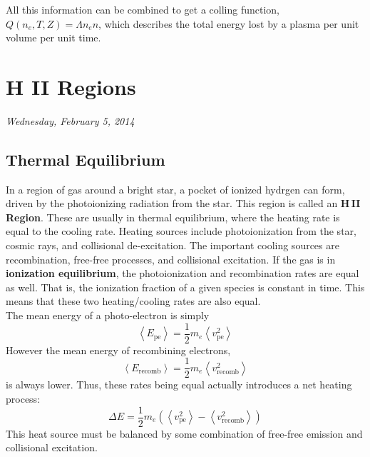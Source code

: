 \documentclass[10pt]{article}
\numberwithin{equation}{section}
\newcommand{\n}{\noindent}
\newcommand{\avg}[1]{\left\langle#1\right\rangle}
\begin{document}
  \n All this information can be combined to get a colling function, $Q(n_e, T,
  Z)=\Lambda n_e n$, which describes the total energy lost by a plasma per unit
  volume per unit time.
\section{H II Regions} %
\label{sec:h,ii_regions}
\textit{Wednesday, February 5, 2014}
\subsection{Thermal Equilibrium} %
\label{sub:thermal_equilibrium}
In a region of gas around a bright star, a pocket of ionized hydrgen can form,
driven by the photoionizing radiation from the star. This region is called an
\textbf{H\,II Region}. These are usually in thermal equilibrium, where the
heating rate is equal to the cooling rate. Heating sources include
photoionization from the star, cosmic rays, and collisional de-excitation. The
important cooling sources are recombination, free-free processes, and
collisional excitation. If the gas is in \textbf{ionization equilibrium}, the
photoionization and recombination rates are equal as well. That is, the
ionization fraction of a given species is constant in time. This means that
these two heating/cooling rates are also equal.\\

\n The mean energy of a photo-electron is simply
\begin{equation}
  \label{eq:h2:1} \avg{E_{\mathrm{pe}}} = \frac{1}{2}m_e\avg{v_{\mathrm{pe}}^2}
\end{equation}
However the mean energy of recombining electrons,
\begin{equation}
  \label{eq:h2:2} \avg{E_{\mathrm{recomb}}} =
  \frac{1}{2}m_e\avg{v_{\mathrm{recomb}}^2}
\end{equation}
is always lower. Thus, these rates being equal actually introduces a net
heating process:
\begin{equation}
  \label{eq:h2:3} \Delta E = \frac{1}{2}m_e\left(\avg{v_{\mathrm{pe}}^2} -
  \avg{v_{\mathrm{recomb}}^2}\right)
\end{equation}
This heat source must be balanced by some combination of free-free emission and
collisional excitation.
\end{document}
